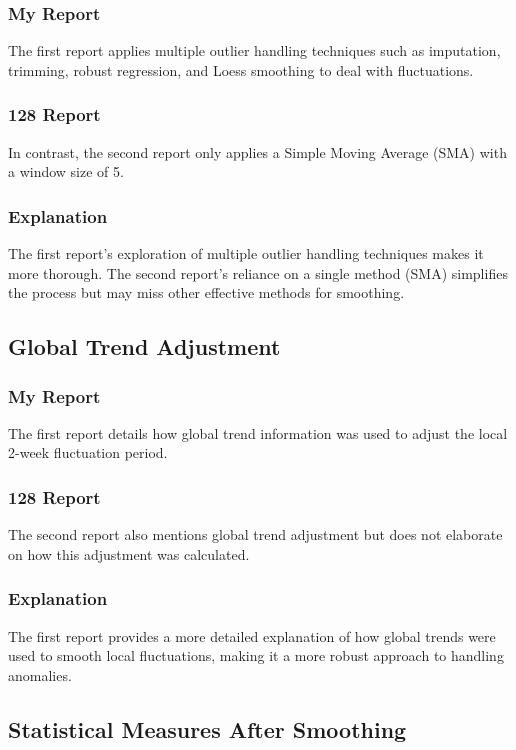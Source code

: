 \subsubsection*{My Report}
The first report applies multiple outlier handling techniques such as imputation, trimming, robust regression, and Loess smoothing to deal with fluctuations.

\subsubsection*{128 Report}
In contrast, the second report only applies a Simple Moving Average (SMA) with a window size of 5.

\subsubsection*{Explanation}
The first report’s exploration of multiple outlier handling techniques makes it more thorough. The second report’s reliance on a single method (SMA) simplifies the process but may miss other effective methods for smoothing.

\subsection*{Global Trend Adjustment}

\subsubsection*{My Report}
The first report details how global trend information was used to adjust the local 2-week fluctuation period.

\subsubsection*{128 Report}
The second report also mentions global trend adjustment but does not elaborate on how this adjustment was calculated.

\subsubsection*{Explanation}
The first report provides a more detailed explanation of how global trends were used to smooth local fluctuations, making it a more robust approach to handling anomalies.

\subsection*{Statistical Measures After Smoothing}

